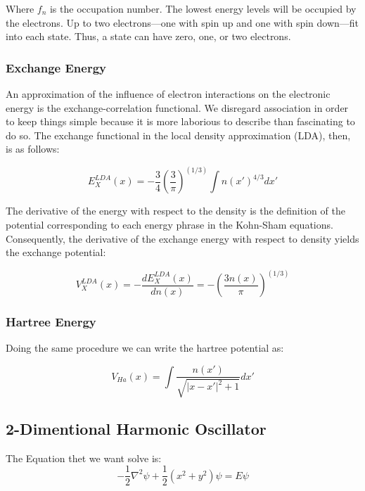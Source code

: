 \documentclass{article}
\begin{document}
\begin{multicols}{2}
Where $f_n$ is the occupation number. The lowest energy levels will be occupied by the electrons. Up to two electrons—one with spin up and one with spin down—fit into each state. Thus, a state can have zero, one, or two electrons.

\subsubsection{\label{Hartree}Exchange Energy}

An approximation of the influence of electron interactions on the electronic energy is the exchange-correlation functional. We disregard association in order to keep things simple because it is more laborious to describe than fascinating to do so. The exchange functional in the local density approximation (LDA), then, is as follows:

\begin{equation}
    E_{X}^{LDA} (x) = -\frac{3}{4}(\frac{3}{\pi})^{(1/3)} \int n(x')^{4/3} dx'
\end{equation}

The derivative of the energy with respect to the density is the definition of the potential corresponding to each energy phrase in the Kohn-Sham equations. Consequently, the derivative of the exchange energy with respect to density yields the exchange potential:

\begin{equation}
    V_{X}^{LDA} (x) = -\frac{dE_{X}^{LDA} (x)}{dn(x)} = -(\frac{3n(x)}{\pi})^{(1/3)}
\end{equation}



\subsubsection{\label{Coulomb}Hartree Energy}

Doing the same procedure we can write the hartree potential as:

\begin{equation}
    V_{Ha} (x) = \int \frac{n(x')}{\sqrt{|x-x'|^2+1}} dx'
\end{equation}



\subsection{\label{2DQHO}2-Dimentional Harmonic Oscillator}

The Equation thet we want solve is:
\begin{equation}
    -\frac{1}{2}\nabla^2\psi + \frac{1}{2}(x^2 + y^2)\psi = E\psi
\end{equation}



\end{multicols}
\end{document}
